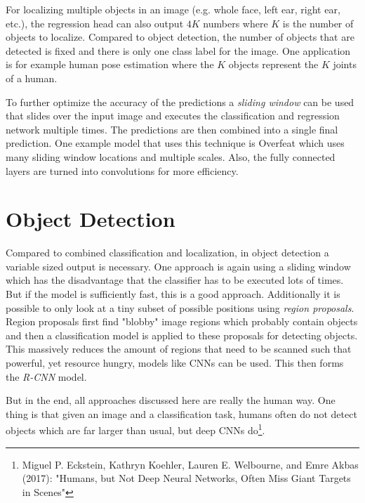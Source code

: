 		For localizing multiple objects in an image (e.g. whole face, left ear, right ear, etc.), the regression head can also output \( 4K \) numbers where \(K\) is the number of objects to localize. Compared to object detection, the number of objects that are detected is fixed and there is only one class label for the image. One application is for example human pose estimation where the \(K\) objects represent the \(K\) joints of a human.

		To further optimize the accuracy of the predictions a \emph{sliding window} can be used that slides over the input image and executes the classification and regression network multiple times. The predictions are then combined into a single final prediction. One example model that uses this technique is Overfeat which uses many sliding window locations and multiple scales. Also, the fully connected layers are turned into convolutions for more efficiency.

	\section{Object Detection}
		Compared to combined classification and localization, in object detection a variable sized output is necessary. One approach is again using a sliding window which has the disadvantage that the classifier has to be executed lots of times. But if the model is sufficiently fast, this is a good approach. Additionally it is possible to only look at a tiny subset of possible positions using \emph{region proposals}. Region proposals first find "blobby" image regions which probably contain objects and then a classification model is applied to these proposals for detecting objects. This massively reduces the amount of regions that need to be scanned such that powerful, yet resource hungry, models like CNNs can be used. This then forms the \emph{R-CNN} model.

		But in the end, all approaches discussed here are really the human way. One thing is that given an image and a classification task, humans often do not detect objects which are far larger than usual, but deep CNNs do\footnote{Miguel P. Eckstein, Kathryn Koehler, Lauren E. Welbourne, and Emre Akbas (2017): "Humans, but Not Deep Neural Networks, Often Miss Giant Targets in Scenes"}.


